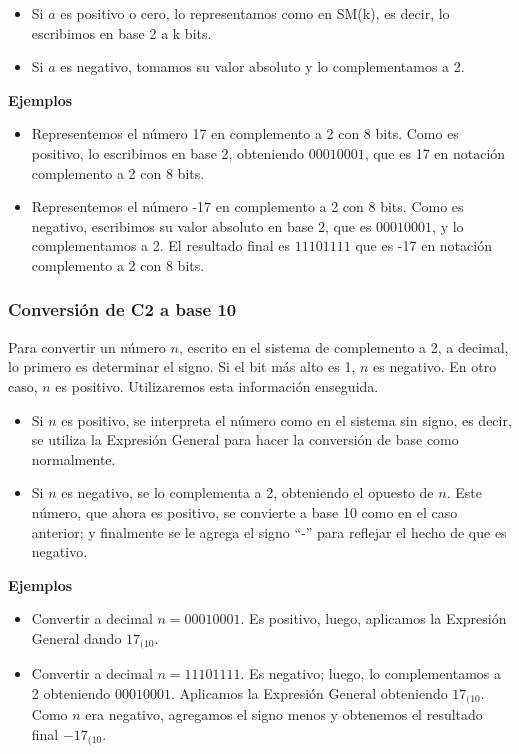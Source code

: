 \documentclass[spanish,A4,]{article}
\begin{document}
\begin{itemize}
\itemsep1pt\parskip0pt
\item
  Si $a$ es positivo o cero, lo representamos como en SM(k), es decir,
  lo escribimos en base 2 a k bits.
\item
  Si $a$ es negativo, tomamos su valor absoluto y lo complementamos a 2.
\end{itemize}

\textbf{Ejemplos}

\begin{itemize}
\itemsep1pt\parskip0pt
\item
  Representemos el número 17 en complemento a 2 con 8 bits. Como es
  positivo, lo escribimos en base 2, obteniendo $00010001$, que es 17 en
  notación complemento a 2 con 8 bits.
\item
  Representemos el número -17 en complemento a 2 con 8 bits. Como es
  negativo, escribimos su valor absoluto en base 2, que es $00010001$, y
  lo complementamos a 2. El resultado final es $11101111$ que es -17 en
  notación complemento a 2 con 8 bits.
\end{itemize}

\subsubsection{Conversión de C2 a base
10}\label{conversiuxf3n-de-c2-a-base-10}

Para convertir un número $n$, escrito en el sistema de complemento a 2,
a decimal, lo primero es determinar el signo. Si el bit más alto es 1,
$n$ es negativo. En otro caso, $n$ es positivo. Utilizaremos esta
información enseguida.

\begin{itemize}
\itemsep1pt\parskip0pt
\item
  Si $n$ es positivo, se interpreta el número como en el sistema sin
  signo, es decir, se utiliza la Expresión General para hacer la
  conversión de base como normalmente.
\item
  Si $n$ es negativo, se lo complementa a 2, obteniendo el opuesto de
  $n$. Este número, que ahora es positivo, se convierte a base 10 como
  en el caso anterior; y finalmente se le agrega el signo ``-'' para
  reflejar el hecho de que es negativo.
\end{itemize}

\textbf{Ejemplos}

\begin{itemize}
\itemsep1pt\parskip0pt
\item
  Convertir a decimal $n = 00010001$. Es positivo, luego, aplicamos la
  Expresión General dando $17_{(10}$.
\item
  Convertir a decimal $n = 11101111$. Es negativo; luego, lo
  complementamos a 2 obteniendo $00010001$. Aplicamos la Expresión
  General obteniendo $17_{(10}$. Como $n$ era negativo, agregamos el
  signo menos y obtenemos el resultado final $-17_{(10}$.
\end{itemize}
\end{document}
